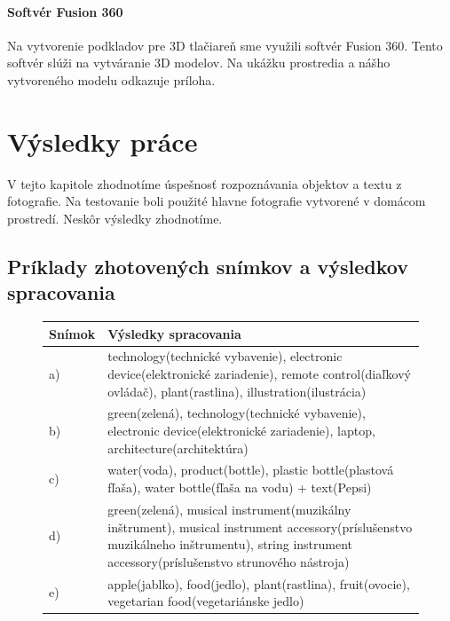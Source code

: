 \documentclass{template/socthesis}
\begin{document}
\subsubsection{Softvér Fusion 360}
Na vytvorenie podkladov pre 3D tlačiareň sme využili softvér Fusion 360. Tento softvér slúži na vytváranie 3D modelov. Na ukážku prostredia a nášho vytvoreného modelu odkazuje príloha. 

\newpage

\chapter*{Výsledky práce}
V tejto kapitole zhodnotíme úspešnosť rozpoznávania objektov a textu z fotografie. Na testovanie boli použité hlavne fotografie vytvorené v domácom prostredí. Neskôr výsledky zhodnotíme.

\section{Príklady zhotovených snímkov a výsledkov spracovania}


\begin{figure}[htp]	
	\begin{tabularx}{\textwidth}{|l|X| }
		\hline
		\textbf{Snímok} & \textbf{Výsledky spracovania} \\
		\hline
		a) & technology(technické vybavenie), electronic device(elektronické zariadenie), remote control(diaľkový ovládač), plant(rastlina), illustration(ilustrácia) \\
		\hline
		b) & green(zelená), technology(technické vybavenie), electronic device(elektronické zariadenie), laptop, architecture(architektúra) \\
		\hline
		c) & water(voda), product(bottle), plastic bottle(plastová fľaša), water bottle(fľaša na vodu) + text(Pepsi) \\
		\hline
		d) & green(zelená), musical instrument(muzikálny inštrument), musical instrument accessory(príslušenstvo muzikálneho inštrumentu), string instrument accessory(príslušenstvo strunového nástroja) \\
		\hline
		e) & apple(jablko), food(jedlo), plant(rastlina), fruit(ovocie), 
		vegetarian food(vegetariánske jedlo) \\
		\hline
	\end{tabularx}
\end{figure}
\end{document}
